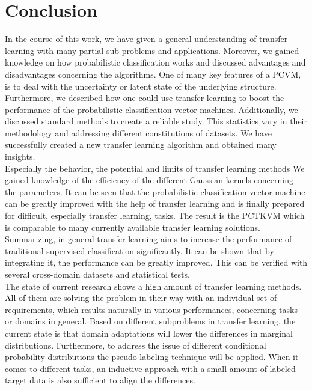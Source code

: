 \chapter{Conclusion}\label{ConChap}	
In the course of this work, we have given a general understanding of transfer learning with many partial sub-problems and applications.
Moreover, we gained knowledge on how probabilistic classification works and discussed advantages and disadvantages concerning the algorithms.
One of many key features of a \acs{PCVM}, is to deal with the uncertainty or latent state of the underlying structure.\\
Furthermore, we described how one could use transfer learning to boost the performance of the probabilistic classification vector machines.
Additionally, we discussed standard methods to create a reliable study.
This statistics vary in their methodology and addressing different constitutions of datasets.
We have successfully created a new transfer learning algorithm and obtained many insights.\\
Especially the behavior, the potential and limits of transfer learning methods
We gained knowledge of the efficiency of the different Gaussian kernels concerning the parameters.
It can be seen that the probabilistic classification vector machine can be greatly improved with the help of transfer learning and is finally prepared for difficult, especially transfer learning, tasks.
The result is the \acl{PCTKVM} which is comparable to many currently available transfer learning solutions.\\ 
Summarizing, in general transfer learning aims to increase the performance of traditional supervised classification significantly.
It can be shown that by integrating it, the performance can be greatly improved.
This can be verified with several cross-domain datasets and statistical tests.\\
The state of current research shows a high amount of transfer learning methods.\cite[p. 33]{Weiss.2016}
All of them are solving the problem in their way with an individual set of requirements, which results naturally in various performances, concerning tasks or domains in general.
Based on different subproblems in transfer learning, the current state is that domain adaptations will lower the differences in marginal distributions. Furthermore, to address the issue of different conditional probability distributions the pseudo labeling technique will be applied. When it comes to different tasks, an inductive approach with a small amount of labeled target data is also sufficient to align the differences.
